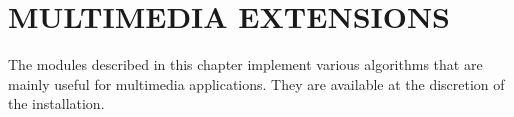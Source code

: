 \chapter{MULTIMEDIA EXTENSIONS}

The modules described in this chapter implement various algorithms
that are mainly useful for multimedia applications.  They are
available at the discretion of the installation.
